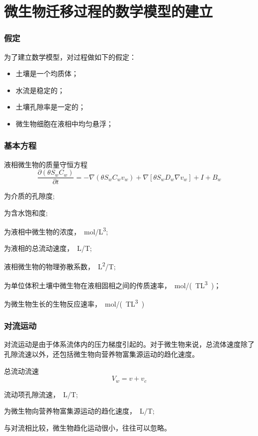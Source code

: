 \documentclass[xcolor=dvipsnames]{beamer}
\begin{document}
\section{微生物迁移过程的数学模型的建立}
	\begin{frame}
	\frametitle{假定}
	为了建立数学模型，对过程做如下的假定：
	\begin{itemize}
	\fangsong
	\item 土壤是一个均质体； 
	\item 水流是稳定的； 
	\item 土壤孔隙率是一定的； 
	\item 微生物细胞在液相中均匀悬浮； 
	\end{itemize}\par
	\end{frame}
	\begin{frame}
	\frametitle{基本方程}
	\begin{block}{\fangsong 液相微生物的质量守恒方程}
	\begin{equation}\label{equ:yexiangshouheng}
	\dfrac{\partial(\theta S_w C_w)}{\partial t}
	=-\nabla(\theta S_w C_w v_w)+\nabla[\theta S_wD_w\nabla v_w]+I+B_w
	\end{equation}
	\end{block}
	\begin{description}\setlength{\itemsep}{0em}
	\item[$\theta$]为介质的孔隙度;
	\item[$S_w$]为含水饱和度;
	\item[$C_w$]为液相中微生物的浓度，\SI{}{mol/L^3};
	\item[$V_w$]为液相的总流动速度，\SI{}{L/T};
	\item[$D_w$]液相微生物的物理弥散系数，\SI{}{L^2/T};
	\item[$I$]为单位体积土壤中微生物在液相固相之间的传质速率，\SI{}{mol/(TL^3)}；
	\item[$B_w$]为微生物生长的生物反应速率，\SI{}{mol/(TL^3)}
	\end{description}
	\end{frame}
	\begin{frame}
	\frametitle{对流运动}
	对流运动是由于体系流体内的压力梯度引起的。对于微生物来说，总流体速度除了孔隙流速以外，还包括微生物向营养物富集源运动的趋化速度。
	\begin{block}{\fangsong 总流动流速}
	\begin{equation}
		V_w=v+v_c
	\end{equation}
	\end{block}
		\begin{description}\setlength{\itemsep}{0em}
	\item[$V$]流动项孔隙流速，\SI{}{L/T};
	\item[$V_c$]为微生物向营养物富集源运动的趋化速度，\SI{}{L/T};
	\end{description}\par
	与对流相比较，微生物趋化运动很小，往往可以忽略。
	\end{frame}
\end{document}
